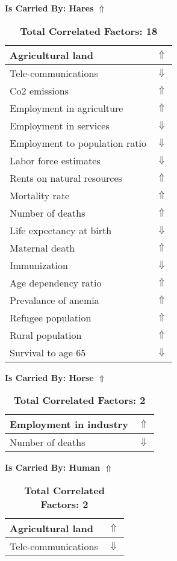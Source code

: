 \documentclass[12pt,notitlepage,oneside]{report}
\begin{document}
\begin{table}[!htb]
\caption{\textbf{Is Carried By: Hares $\Uparrow$}}
\centering
\label{Correlated Socio-economic Factors0}
\begin{tabular}{|l|l|}
\hline
Agricultural land & $\Uparrow$\\ \hline
Tele-communications & $\Downarrow$\\ \hline
Co2 emissions & $\Uparrow$\\ \hline
Employment in agriculture & $\Uparrow$\\ \hline
Employment in services & $\Downarrow$\\ \hline
Employment to population ratio & $\Downarrow$\\ \hline
Labor force estimates & $\Downarrow$\\ \hline
Rents on natural resources & $\Uparrow$\\ \hline
Mortality rate & $\Uparrow$\\ \hline
Number of deaths & $\Uparrow$\\ \hline
Life expectancy at birth & $\Downarrow$\\ \hline
Maternal death & $\Uparrow$\\ \hline
Immunization & $\Downarrow$\\ \hline
Age dependency ratio & $\Uparrow$\\ \hline
Prevalance of anemia & $\Uparrow$\\ \hline
Refugee population & $\Uparrow$\\ \hline
Rural population & $\Uparrow$\\ \hline
Survival to age 65 & $\Downarrow$\\ \hline
\end{tabular}
\caption*{\textbf{Total Correlated Factors: 18}}
\end{table}
\begin{table}[!htb]
\caption{\textbf{Is Carried By: Horse $\Uparrow$}}
\centering
\label{Correlated Socio-economic Factors0}
\begin{tabular}{|l|l|}
\hline
Employment in industry & $\Uparrow$\\ \hline
Number of deaths & $\Downarrow$\\ \hline
\end{tabular}
\caption*{\textbf{Total Correlated Factors: 2}}
\end{table}
\begin{table}[!htb]
\caption{\textbf{Is Carried By: Human $\Uparrow$}}
\centering
\label{Correlated Socio-economic Factors0}
\begin{tabular}{|l|l|}
\hline
Agricultural land & $\Uparrow$\\ \hline
Tele-communications & $\Downarrow$\\ \hline
\end{tabular}
\caption*{\textbf{Total Correlated Factors: 2}}
\end{table}
\end{document}
